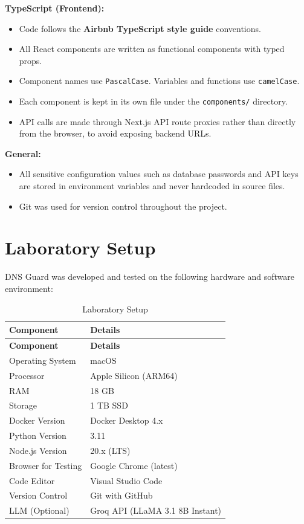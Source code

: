 \documentclass[12pt, a4paper, oneside]{report}
\begin{document}
\textbf{TypeScript (Frontend):}
\begin{itemize}
    \item Code follows the \textbf{Airbnb TypeScript style guide} conventions.
    \item All React components are written as functional components with typed props.
    \item Component names use \texttt{PascalCase}. Variables and functions use \texttt{camelCase}.
    \item Each component is kept in its own file under the \texttt{components/} directory.
    \item API calls are made through Next.js API route proxies rather than directly from the browser, to avoid exposing backend URLs.
\end{itemize}

\textbf{General:}
\begin{itemize}
    \item All sensitive configuration values such as database passwords and API keys are stored in environment variables and never hardcoded in source files.
    \item Git was used for version control throughout the project.
\end{itemize}

\section{Laboratory Setup}

DNS Guard was developed and tested on the following hardware and software environment:

\begin{longtable}{|p{5cm}|p{9cm}|}
\caption{Laboratory Setup}\\
\hline
\rowcolor{nfsuBlue!15}
\textbf{Component} & \textbf{Details} \\
\hline
\endfirsthead
\hline
\rowcolor{nfsuBlue!15}
\textbf{Component} & \textbf{Details} \\
\hline
\endhead
\hline
\endfoot
Operating System & macOS \\
\hline
Processor & Apple Silicon (ARM64) \\
\hline
RAM & 18 GB \\
\hline
Storage & 1 TB SSD \\
\hline
Docker Version & Docker Desktop 4.x \\
\hline
Python Version & 3.11 \\
\hline
Node.js Version & 20.x (LTS) \\
\hline
Browser for Testing & Google Chrome (latest) \\
\hline
Code Editor & Visual Studio Code \\
\hline
Version Control & Git with GitHub \\
\hline
LLM (Optional) & Groq API (LLaMA 3.1 8B Instant) \\
\hline
\end{longtable}
\end{document}
